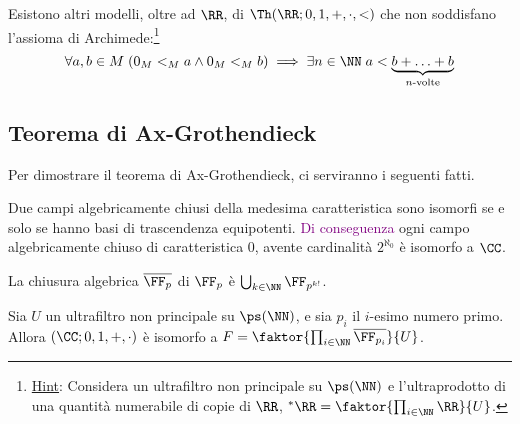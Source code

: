 \begin{exercise}
    Esistono altri modelli, oltre ad $\RR$, di $\Th(\RR;0,1,+,\cdot,<)$ che non soddisfano l'assioma di Archimede:\footnote{\underline{Hint}: Considera un ultrafiltro non principale su $\ps(\NN)$ e l'ultraprodotto di una quantità numerabile di copie di $\RR$, ${}^*\RR = \faktor{\prod_{i \in \NN}\RR}{U}$.}
    \[ \forall a,b \in M \; (0_M <_M a \land 0_M <_M b) \implies \exists n \in \NN \; a < \underbrace{b + \ldots + b}_{\text{$n$-volte}}
    \]
\end{exercise}

\subsection{Teorema di Ax-Grothendieck}

Per dimostrare il teorema di Ax-Grothendieck, ci serviranno i seguenti fatti.

\begin{fact}
    Due campi algebricamente chiusi della medesima caratteristica sono isomorfi se e solo se hanno basi di trascendenza equipotenti. \textcolor{purple}{Di conseguenza} ogni
    campo algebricamente chiuso di caratteristica 0, avente cardinalità $2^{\aleph_0}$ è isomorfo a $\CC$.
\end{fact}

\begin{fact}
    La chiusura algebrica $\overline{\FF_p}$ di $\FF_p$ è $\bigcup_{k\in \NN}\FF_{p^{k!}}$.
\end{fact}

\begin{lemma} 
    Sia $U$ un ultrafiltro non principale su $\ps(\NN)$, e sia $p_i$ il $i$-esimo numero primo. Allora $(\CC;0,1,+,\cdot)$ è isomorfo a $F = \faktor{\prod_{i \in \NN}\overline{\FF_{p_i}}}{U}$.
\end{lemma}

